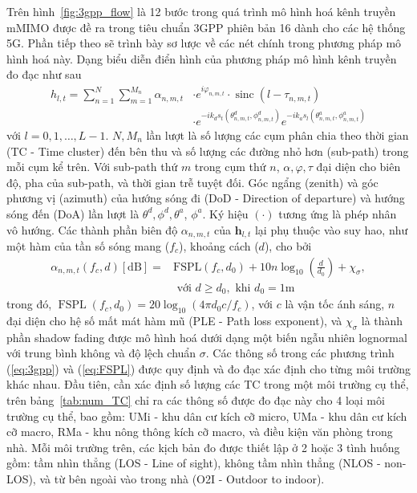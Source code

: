 Trên hình~\ref{fig:3gpp_flow} là 12 bước trong quá trình mô hình hoá kênh truyền mMIMO được đề ra trong tiêu chuẩn 3GPP phiên bản 16 dành cho các hệ thống 5G. Phần tiếp theo sẽ trình bày sơ lược về các nét chính trong phương pháp mô hình hoá này. Dạng biểu diễn điển hình của phương pháp mô hình kênh truyền đo đạc như sau~\cite{Ju2021}
\begin{equation}
    \label{eq:3gpp}
    \begin{aligned}
        {h}_{l, t} = \sum\limits_{n=1}^{N} \sum\limits_{m=1}^{M_n} \alpha_{n, m, t} & \cdot e^{i\varphi_{n, m, t}} \cdot \operatorname{sinc}\left(l-\tau_{n, m, t}\right) \\
        &\cdot e^{-i k_d s_t(\theta^d_{n, m, t}, \phi^d_{n, m, t})} e^{-i k_a s_l(\theta^a_{n, m, t}, \phi^a_{n, m, t})} 
    \end{aligned}
\end{equation}
với $l= 0,1,\ldots, L-1$. $N, M_n$ lần lượt là số lượng các cụm phân chia theo thời gian (TC - Time cluster) đến bên thu và số lượng các đường nhỏ hơn (sub-path) trong mỗi cụm kể trên. Với sub-path thứ $m$ trong cụm thứ $n$, $\alpha, \varphi, \tau$ đại diện cho biên độ, pha của sub-path, và thời gian trễ tuyệt đối. Góc ngẩng (zenith) và góc phương vị (azimuth) của hướng sóng đi (DoD - Direction of departure) và hướng sóng đến (DoA) lần lượt là  $\theta^d, \phi^d, \theta^a$, $\phi^a$. Ký hiệu $(\cdot)$ tương ứng là phép nhân vô hướng. Các thành phần biên độ $\alpha_{n,m,t}$ của $\boldsymbol{h}_{l, t}$ lại phụ thuộc vào suy hao, như một hàm của tần số sóng mang ($f_c$), khoảng cách ($d$), cho bởi
\begin{equation}
    \label{eq:FSPL}
    \begin{aligned}
        \alpha_{n, m, t}(f_c, d)[\mathrm{dB}]=& \mathrm{FSPL}\left(f_c, d_{0}\right)+10 n \log _{10}\left(\frac{d}{d_{0}}\right)+\chi_{\sigma}, \\
        & \text { với } d \geq d_{0}, \text { khi } d_{0}=1\mathrm{m}
    \end{aligned}
\end{equation}
trong đó, $\operatorname{FSPL}\left(f_c, d_{0}\right)=20 \log _{10}\left(4 \pi d_{0} c / f_c\right)$, với $c$ là vận tốc ánh sáng, $n$ đại diện cho hệ số mất mát hàm mũ (PLE - Path loss exponent), và $\chi_{\sigma}$ là thành phần shadow fading được mô hình hoá dưới dạng một biến ngẫu nhiên lognormal với trung bình không và độ lệch chuẩn $\sigma$. Các thông số trong các phương trình (\ref{eq:3gpp}) và (\ref{eq:FSPL}) được quy định và đo đạc xác định cho từng môi trường khác nhau. Đầu tiên, cần xác định số lượng các TC trong một môi trường cụ thể, trên bảng~\ref{tab:num_TC} chỉ ra các thông số được đo đạc này cho 4 loại môi trường cụ thể, bao gồm: UMi - khu dân cư kích cỡ micro, UMa - khu dân cư kích cỡ macro, RMa - khu nông thông kích cỡ macro, và điều kiện văn phòng trong nhà. Mỗi môi trường trên, các kịch bản đo được thiết lập ở 2 hoặc 3 tình huống gồm: tầm nhìn thẳng (LOS - Line of sight), không tầm nhìn thẳng (NLOS - non-LOS), và từ bên ngoài vào trong nhà (O2I - Outdoor to indoor).
